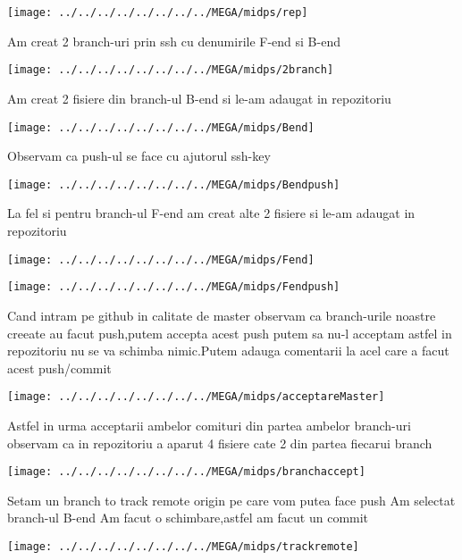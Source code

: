 \begin{center}
\texttt{[image: ../../../../../../../../MEGA/midps/rep]}
\end{center}

Am creat 2 branch-uri prin ssh cu denumirile F-end si B-end

\begin{center}
\texttt{[image: ../../../../../../../../MEGA/midps/2branch]}
\end{center}

Am creat 2 fisiere din branch-ul B-end
si le-am adaugat in repozitoriu
\begin{center}
\texttt{[image: ../../../../../../../../MEGA/midps/Bend]}
\end{center}

Observam ca push-ul se face cu ajutorul ssh-key
\begin{center}
\texttt{[image: ../../../../../../../../MEGA/midps/Bendpush]}
\end{center}

La fel si pentru branch-ul F-end am creat alte 2 fisiere si le-am adaugat in repozitoriu
\begin{center}
\texttt{[image: ../../../../../../../../MEGA/midps/Fend]}
\end{center}

\begin{center}
\texttt{[image: ../../../../../../../../MEGA/midps/Fendpush]}
\end{center}


Cand intram pe github in calitate de master observam ca branch-urile noastre creeate au facut push,putem accepta acest push putem sa nu-l acceptam astfel in repozitoriu nu se va schimba nimic.Putem adauga comentarii la acel care a facut acest push/commit
\begin{center}
\texttt{[image: ../../../../../../../../MEGA/midps/acceptareMaster]}
\end{center}
Astfel in urma acceptarii ambelor comituri din partea ambelor branch-uri observam ca in repozitoriu a aparut 4 fisiere cate 2 din partea fiecarui branch
\begin{center}
\texttt{[image: ../../../../../../../../MEGA/midps/branchaccept]}
\end{center}


Setam un branch to track remote origin pe care vom putea face push
Am selectat branch-ul B-end
Am facut o schimbare,astfel am facut un commit
\begin{center}
\texttt{[image: ../../../../../../../../MEGA/midps/trackremote]}
\end{center}


